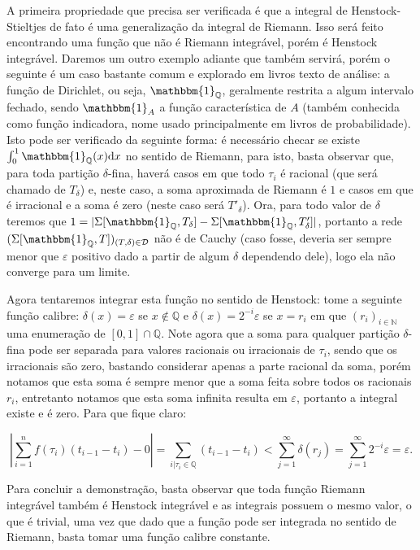 \documentclass[12pt, a4paper]{article}
\theoremstyle{definition}
\begin{document}
A primeira propriedade que precisa ser verificada é que a integral de Henstock-Stieltjes de fato é uma generalização da integral de Riemann. Isso será feito encontrando uma função que não é Riemann integrável, porém é Henstock integrável. Daremos um outro exemplo adiante que também servirá, porém o seguinte é um caso bastante comum e explorado em livros texto de análise: a função de Dirichlet, ou seja, $\mathbbm{1}_{\mathbb{Q}}$, geralmente restrita a algum intervalo fechado, sendo $\mathbbm{1} _A$ a função característica de $A$ (também conhecida como função indicadora, nome usado principalmente em livros de probabilidade). Isto pode ser verificado da seguinte forma: é necessário checar se existe $\int_0^1\mathbbm{1}_{\mathbb{Q}} (x)  \text{d}x $ no sentido de Riemann, para isto, basta observar que, para toda partição $\delta$-fina, haverá casos em que todo $\tau_i$ é racional (que será chamado de $T_\delta$) e, neste caso, a soma aproximada de Riemann é $1$ e casos em que é irracional e a soma é zero (neste caso será $T'_\delta$). Ora, para todo valor de $\delta$ teremos que $1=| \Sigma [\mathbbm{1}_{\mathbb{Q}},T_\delta ]- \Sigma [\mathbbm{1}_{\mathbb{Q}},T'_\delta ]| $, portanto a rede $ ( \Sigma [\mathbbm{1}_{\mathbb{Q}},T])_{(T,\delta)\in \mathcal{D}}$ não é de Cauchy (caso fosse, deveria ser sempre menor que $\varepsilon$ positivo dado a partir de algum $\delta$ dependendo dele), logo ela não converge para um limite. 

Agora tentaremos integrar esta função no sentido de Henstock: tome a seguinte função calibre: $\delta(x)=\varepsilon$ se $x\notin \mathbb{Q}$ e $\delta (x)=2^{-i} \varepsilon$ se $x=r_i$ em que $(r_i)_{i\in \mathbb{N}}$ uma enumeração de $[0,1]\cap \mathbb{Q}$. Note agora que a soma para qualquer partição $\delta$-fina pode ser separada para valores racionais ou irracionais de $\tau_i$, sendo que os irracionais são zero, bastando considerar apenas a parte racional da soma, porém notamos que esta soma é sempre menor que a soma feita sobre todos os racionais $r_i$, entretanto notamos que esta soma infinita resulta em $\varepsilon$, portanto a integral existe e é zero. Para que fique claro: 

$$\left| \sum_{i=1}^n f(\tau_i)(t_{i-1}-t_{i}) -0\right| = \sum_{i|\tau_i\in\mathbb{Q}}(t_{i-1}-t_{i})<\sum_{j=1}^{\infty} \delta (r_j)=\sum_{j=1}^{\infty}2^{-i}\varepsilon=\varepsilon.$$

Para concluir a demonstração, basta observar que toda função Riemann integrável também é Henstock integrável e as integrais possuem o mesmo valor, o que é trivial, uma vez que dado que a função pode ser integrada no sentido de Riemann, basta tomar uma função calibre constante. 
\end{document}
